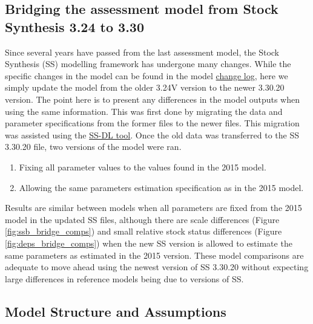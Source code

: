 \documentclass[11pt,
  english,
  letterpaper,
]{article}
\providecommand{\tightlist}{%
  \setlength{\itemsep}{0pt}\setlength{\parskip}{0pt}}
\providecommand{\tightlist}{%
  \setlength{\itemsep}{0pt}\setlength{\parskip}{0pt}}
\begin{document}
\hypertarget{bridging-the-assessment-model-from-stock-synthesis-3.24-to-3.30}{%
\subsection{Bridging the assessment model from Stock Synthesis 3.24 to 3.30}\label{bridging-the-assessment-model-from-stock-synthesis-3.24-to-3.30}}

Since several years have passed from the last assessment model, the Stock Synthesis (SS) modelling framework has undergone many changes. While the specific changes in the model can be found in the model \href{https://github.com/nmfs-stock-synthesis/stock-synthesis/blob/v3.30.19/Change_log_for_SS_3.30.xlsx?raw=true}{change log}, here we simply update the model from the older 3.24V version to the newer 3.30.20 version. The point here is to present any differences in the model outputs when using the same information. This was first done by migrating the data and parameter specifications from the former files to the newer files. This migration was assisted using the \href{https://github.com/shcaba/SS-DL-tool}{SS-DL tool}. Once the old data was transferred to the SS 3.30.20 file, two versions of the model were ran.

\begin{enumerate}
\def\labelenumi{\arabic{enumi})}
\tightlist
\item
  Fixing all parameter values to the values found in the 2015 model.
\item
  Allowing the same parameters estimation specification as in the 2015 model.
\end{enumerate}

Results are similar between models when all parameters are fixed from the 2015 model in the updated SS files, although there are scale differences (Figure \ref{fig:ssb_bridge_comps}) and small relative stock status differences (Figure \ref{fig:deps_bridge_comps}) when the new SS version is allowed to estimate the same parameters as estimated in the 2015 version. These model comparisons are adequate to move ahead using the newest version of SS 3.30.20 without expecting large differences in reference models being due to versions of SS.

\hypertarget{model-structure-and-assumptions}{%
\subsection{Model Structure and Assumptions}\label{model-structure-and-assumptions}}
\end{document}
